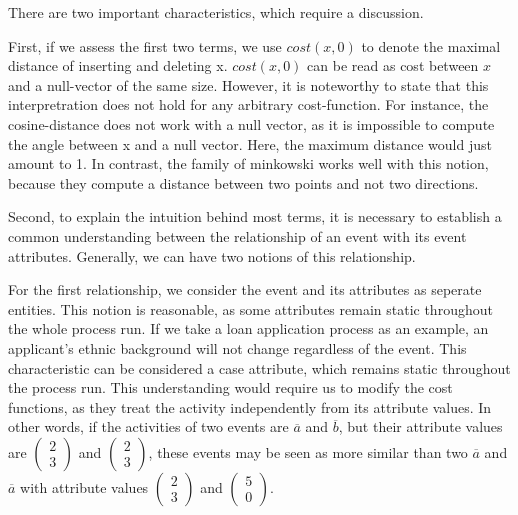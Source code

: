 \documentclass[./../../paper.tex]{subfiles}
\begin{document}
There are two important characteristics, which require a discussion.

First, if we assess the first two terms, we use $cost(x,0)$ to denote the maximal distance of inserting and deleting x. $cost(x,0)$ can be read as cost between $x$ and a null-vector of the same size. However, it is noteworthy to state that this interpretration does not hold for any arbitrary cost-function. For instance, the cosine-distance does not work with a null vector, as it is impossible to compute the angle between x and a null vector. Here, the maximum distance would just amount to 1. In contrast, the family of \Gls{minkowski} works well with this notion, because they compute a distance between two points and not two directions. 

Second, to explain the intuition behind most terms, it is necessary to establish a common understanding between the relationship of an event with its event attributes. Generally, we can have two notions of this relationship. 

For the first relationship, we consider the event and its attributes as seperate entities. This notion is reasonable, as some attributes remain static throughout the whole process run. If we take a loan application process as an example, an applicant's ethnic background will not change regardless of the event. This characteristic can be considered a case attribute, which remains static throughout the process run. This understanding would require us to modify the cost functions, as they treat the activity independently from its attribute values. In other words, if the activities of two events are $\overline{a}$ and $\overline{b}$, but their attribute values are $\left(\begin{smallmatrix}2 \\ 3\end{smallmatrix}\right)$ and $\left(\begin{smallmatrix}2 \\ 3\end{smallmatrix}\right)$, these events may be seen as more similar than two $\overline{a}$ and $\overline{a}$ with attribute values $\left(\begin{smallmatrix}2 \\ 3\end{smallmatrix}\right)$ and $\left(\begin{smallmatrix}5 \\ 0\end{smallmatrix}\right)$. 
\end{document}
